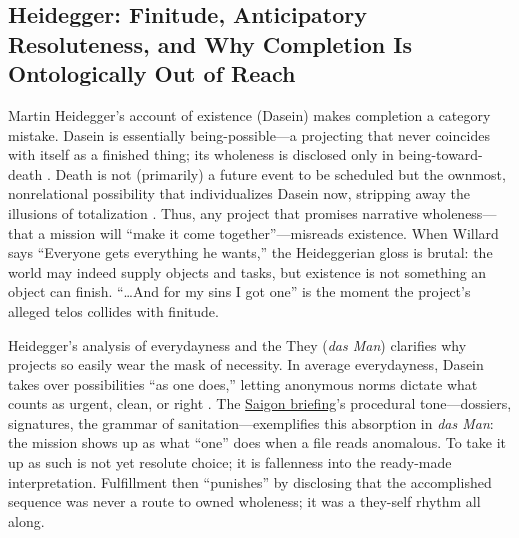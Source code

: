 \subsection*{Heidegger: Finitude, Anticipatory Resoluteness, and Why Completion Is
	Ontologically Out of Reach}
\label{ssec:iii-heidegger}
Martin Heidegger's account of existence (Dasein) makes completion a category mistake. Dasein is
essentially being-possible—a projecting that never coincides with itself as a finished thing;
its wholeness is disclosed only in being-toward-death \parencite[pp.~279--311]{HeideggerBT1962}.
Death is not (primarily) a future event to be scheduled but the ownmost, nonrelational
possibility that individualizes Dasein now, stripping away the illusions of totalization
\parencite[pp.~294--307]{HeideggerBT1962}. Thus, any project that promises narrative wholeness—that
a mission will ``make it come together''—misreads existence. When Willard says ``Everyone gets
everything he wants,'' the Heideggerian gloss is brutal: the world may indeed supply objects and
tasks, but existence is not something an object can finish. ``\ldots And for my sins I got one''
is the moment the project's alleged telos collides with finitude.

Heidegger's analysis of everydayness and the They (\emph{das Man}) clarifies why projects so
easily wear the mask of necessity. In average everydayness, Dasein takes over possibilities ``as
one does,'' letting anonymous norms dictate what counts as urgent, clean, or right
\parencite[pp.~149--168]{HeideggerBT1962}. The \hyperref[scene:briefing]{Saigon briefing}'s
procedural tone—dossiers, signatures, the grammar of sanitation—exemplifies this absorption in
\emph{das Man}: the mission
shows up as what ``one'' does when a file reads anomalous. To take it up as such is not yet
resolute choice; it is fallenness into the ready-made interpretation. Fulfillment then
``punishes'' by disclosing that the accomplished sequence was never a route to owned wholeness;
it was a they-self rhythm all along.

